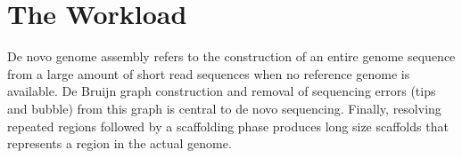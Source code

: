 \documentclass[conference]{IEEEtran}
\begin{document}


\section {The Workload} \label{TheWorkload}
De novo genome assembly refers to the construction of an entire genome sequence from a large amount of short read sequences when no reference genome is available. 
De Bruijn graph construction  and removal of sequencing errors (tips and bubble) from this graph is central to de novo sequencing. 
Finally, resolving  repeated regions followed by a scaffolding phase produces long size scaffolds that represents a region in the actual genome.
\end{document}
